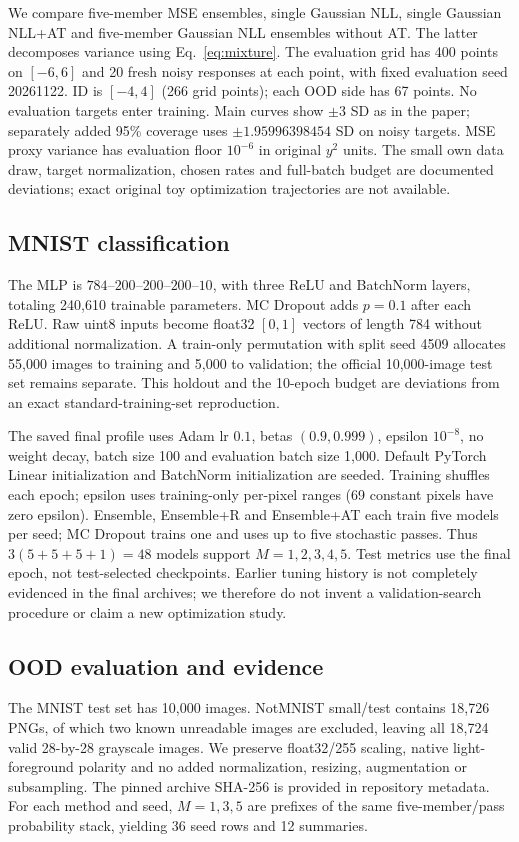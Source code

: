 \documentclass[11pt,a4paper]{article}
\begin{document}
We compare five-member MSE ensembles, single Gaussian NLL, single Gaussian NLL+AT and five-member Gaussian NLL ensembles without AT. The latter decomposes variance using Eq.~\eqref{eq:mixture}. The evaluation grid has 400 points on $[-6,6]$ and 20 fresh noisy responses at each point, with fixed evaluation seed 20261122. ID is $[-4,4]$ (266 grid points); each OOD side has 67 points. No evaluation targets enter training. Main curves show $\pm3$ SD as in the paper; separately added 95\% coverage uses $\pm1.95996398454$ SD on noisy targets. MSE proxy variance has evaluation floor $10^{-6}$ in original $y^2$ units. The small own data draw, target normalization, chosen rates and full-batch budget are documented deviations; exact original toy optimization trajectories are not available.

\subsection{MNIST classification}
The MLP is $784$--$200$--$200$--$200$--$10$, with three ReLU and BatchNorm layers, totaling 240,610 trainable parameters. MC Dropout adds $p=0.1$ after each ReLU. Raw uint8 inputs become float32 $[0,1]$ vectors of length 784 without additional normalization. A train-only permutation with split seed 4509 allocates 55,000 images to training and 5,000 to validation; the official 10,000-image test set remains separate. This holdout and the 10-epoch budget are deviations from an exact standard-training-set reproduction.

The saved final profile uses Adam lr $0.1$, betas $(0.9,0.999)$, epsilon $10^{-8}$, no weight decay, batch size 100 and evaluation batch size 1,000. Default PyTorch Linear initialization and BatchNorm initialization are seeded. Training shuffles each epoch; epsilon uses training-only per-pixel ranges (69 constant pixels have zero epsilon). Ensemble, Ensemble+R and Ensemble+AT each train five models per seed; MC Dropout trains one and uses up to five stochastic passes. Thus $3(5+5+5+1)=48$ models support $M=1,2,3,4,5$. Test metrics use the final epoch, not test-selected checkpoints. Earlier tuning history is not completely evidenced in the final archives; we therefore do not invent a validation-search procedure or claim a new optimization study.

\subsection{OOD evaluation and evidence}
The MNIST test set has 10,000 images. NotMNIST small/test contains 18,726 PNGs, of which two known unreadable images are excluded, leaving all 18,724 valid 28-by-28 grayscale images. We preserve float32/255 scaling, native light-foreground polarity and no added normalization, resizing, augmentation or subsampling. The pinned archive SHA-256 is provided in repository metadata. For each method and seed, $M=1,3,5$ are prefixes of the same five-member/pass probability stack, yielding 36 seed rows and 12 summaries.
\end{document}
